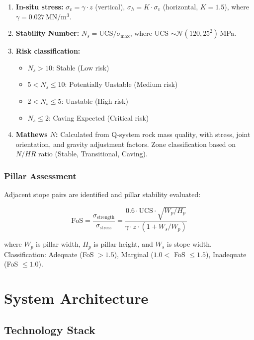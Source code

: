 \documentclass[12pt,a4paper]{article}
\begin{document}
\begin{enumerate}
    \item \textbf{In-situ stress:} $\sigma_v = \gamma \cdot z$ (vertical), $\sigma_h = K \cdot \sigma_v$ (horizontal, $K = 1.5$), where $\gamma = 0.027$\,MN/m$^3$.
    \item \textbf{Stability Number:} $N_s = \text{UCS} / \sigma_{\max}$, where UCS $\sim \mathcal{N}(120, 25^2)$\,MPa.
    \item \textbf{Risk classification:}
    \begin{itemize}
        \item $N_s > 10$: Stable (Low risk)
        \item $5 < N_s \leq 10$: Potentially Unstable (Medium risk)
        \item $2 < N_s \leq 5$: Unstable (High risk)
        \item $N_s \leq 2$: Caving Expected (Critical risk)
    \end{itemize}
    \item \textbf{Mathews $N$:} Calculated from Q-system rock mass quality, with stress, joint orientation, and gravity adjustment factors. Zone classification based on $N / HR$ ratio (Stable, Transitional, Caving).
\end{enumerate}

\subsubsection{Pillar Assessment}

Adjacent stope pairs are identified and pillar stability evaluated:

\begin{equation}
    \text{FoS} = \frac{\sigma_{\text{strength}}}{\sigma_{\text{stress}}} = \frac{0.6 \cdot \text{UCS} \cdot \sqrt{W_p / H_p}}{\gamma \cdot z \cdot (1 + W_s / W_p)}
\end{equation}

where $W_p$ is pillar width, $H_p$ is pillar height, and $W_s$ is stope width. Classification: Adequate (FoS $> 1.5$), Marginal ($1.0 < $ FoS $\leq 1.5$), Inadequate (FoS $\leq 1.0$).

\section{System Architecture}
\label{sec:architecture}

\subsection{Technology Stack}
\end{document}

